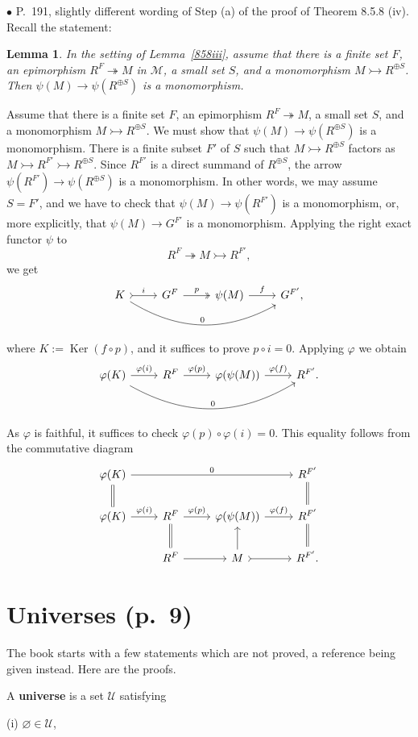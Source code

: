 \documentclass[12pt]{article}
\newtheorem{lem}[thm]{Lemma}
\theoremstyle{remark}%
\newcommand{\bu}{\bullet}
\newcommand{\n}{\noindent}
\newcommand{\M}{\mathcal M}
\newcommand{\epi}{\twoheadrightarrow}
\newcommand{\m}{\rightarrowtail}
\newcommand{\p}{\varphi}
\newcommand{\pf}{\n{\em Proof. }}
\DeclareMathOperator{\Ker}{Ker}
\begin{document}
\n$\bu$ P.~191, slightly different wording of Step (a) of the proof of Theorem 8.5.8 (iv). Recall the statement: 
%
\begin{lem}
%
In the setting of Lemma~\ref{858iii}, assume that there is a finite set $F$, an epimorphism $R^F\epi M$ in $\M$, a small set $S$, and a monomorphism $M\m R^{\oplus S}$. Then $\psi(M)\to\psi(R^{\oplus S})$ is a monomorphism. 
%
\end{lem}
%
\pf Assume that there is a finite set $F$, an epimorphism $R^F\epi M$, a small set $S$, and a monomorphism $M\m R^{\oplus S}$. We must show that $\psi(M)\to\psi(R^{\oplus S})$ is a monomorphism. There is a finite subset $F'$ of $S$ such that $M\m R^{\oplus S}$ factors as $M\m R^{F'}\m R^{\oplus S}$. Since $R^{F'}$ is a direct summand of $R^{\oplus S}$, the arrow $\psi(R^{F'})\to\psi(R^{\oplus S})$ is a monomorphism. In other words, we may assume $S=F'$, and we have to check that $\psi(M)\to\psi(R^{F'})$ is a monomorphism, or, more explicitly, that $\psi(M)\to G^{F'}$ is a monomorphism. Applying the right exact functor $\psi$ to 
$$
R^F\epi M\m R^{F'},
$$
we get 
$$
\begin{tikzcd}
K\ar[tail]{r}{i}\ar[bend right]{rrr}{0}&G^F\ar[two heads]{r}{p}&\psi(M)\ar{r}{f}&G^{F'},
\end{tikzcd}
$$
where $K:=\Ker(f\circ p)$, and it suffices to prove $p\circ i=0$. Applying $\p$ we obtain
$$
\begin{tikzcd}
\p(K)\ar{r}{\p(i)}\ar[bend right]{rrr}{0}&R^F\ar{r}{\p(p)}&\p(\psi(M))\ar{r}{\p(f)}&R^{F'}.
\end{tikzcd}
$$
As $\p$ is faithful, it suffices to check $\p(p)\circ\p(i)=0$. This equality follows from the commutative diagram
$$
\begin{tikzcd}
\p(K)\ar[equal]{d}\ar{rrr}{0}&&&R^{F'}\ar[equal]{d}\\
\p(K)\ar{r}{\p(i)}&R^F\ar[equal]{d}\ar{r}{\p(p)}&\p(\psi(M))\ar{r}{\p(f)}&R^{F'}\ar[equal]{d}\\
&R^F\ar{r}&M\ar[tail]{r}\ar{u}&R^{F'}.
\end{tikzcd}
$$
%
\section{Universes (p.~9)} %
%
The book starts with a few statements which are not proved, a reference being given instead. Here are the proofs.

A \textbf{universe} is a set $\mathcal U$ satisfying 

(i) $\varnothing\in\mathcal U$,
\end{document}
